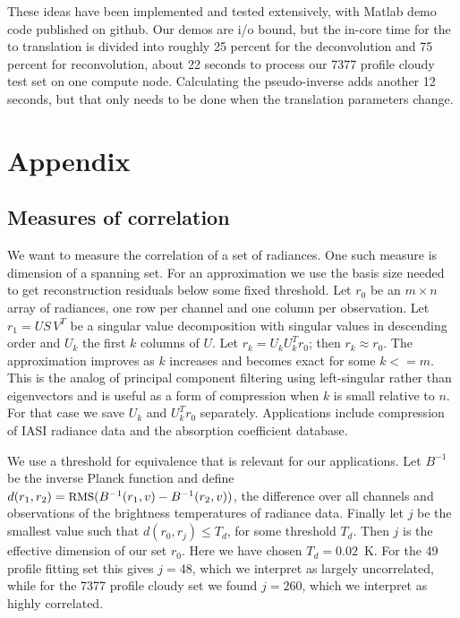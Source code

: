 \documentclass[10pt,twocolumn]{article}
\begin{document}
These ideas have been implemented and tested extensively, with
Matlab demo code published on github.  Our demos are i/o bound, but
the in-core time for the {\airs} to {\cris} translation is divided
into roughly 25 percent for the deconvolution and 75 percent for
reconvolution, about 22 seconds to process our 7377 profile cloudy
test set on one compute node.  Calculating the pseudo-inverse adds
another 12 seconds, but that only needs to be done when the
translation parameters change.

\section{Appendix}
\label{append}

\subsection{Measures of correlation}

We want to measure the correlation of a set of radiances.  One such
measure is dimension of a spanning set.  For an approximation we use
the basis size needed to get reconstruction residuals below some
fixed threshold.  Let $r_0$ be an $m \times n$ array of radiances,
one row per channel and one column per observation.  Let $r_1 = U
S\,V^T$ be a singular value decomposition with singular values in
descending order and $U_k$ the first $k$ columns of $U$.  Let $r_k =
U_k U_k^T r_0$; then $r_k \approx r_0$.  The approximation improves
as $k$ increases and becomes exact for some $k <= m$.  This is the
analog of principal component filtering using left-singular rather
than eigenvectors and is useful as a form of compression when $k$ is
small relative to $n$.  For that case we save $U_k$ and $U_k^T r_0$
separately.  Applications include compression of IASI radiance data
and the {\kcarta} absorption coefficient database.

We use a threshold for equivalence that is relevant for our
applications.  Let $B^{-1}$ be the inverse Planck function and
define $d(r_1, r_2) = \mbox{\small RMS}(B^{-1}(r_1, v) - B^{-1}(r_2, v))$, the
{\rms} difference over all channels and observations of the
brightness temperatures of radiance data.  Finally let $j$ be the
smallest value such that $d(r_0, r_j) \le T_d$, for some threshold
$T_d$.  Then $j$ is the effective dimension of our set $r_0$.  Here
we have chosen $T_d = 0.02$~K.  For the 49 profile fitting set this
gives $j=48$, which we interpret as largely uncorrelated, while for
the 7377 profile cloudy set we found $j=260$, which we interpret as
highly correlated.
\end{document}
